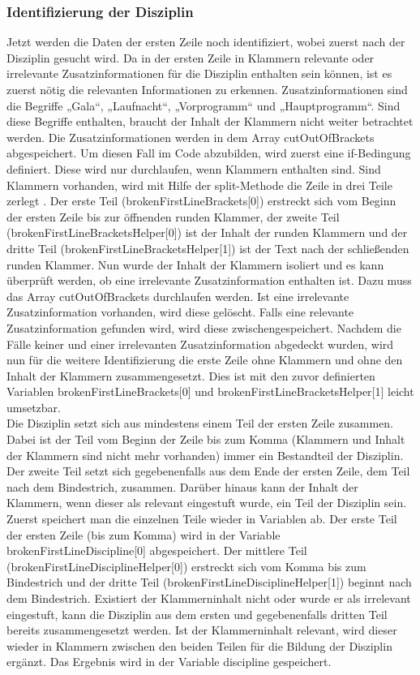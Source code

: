 \subsubsection{Identifizierung der Disziplin}
Jetzt werden die Daten der ersten Zeile noch identifiziert, wobei zuerst nach der Disziplin gesucht wird.
Da in der ersten Zeile in Klammern relevante oder irrelevante Zusatzinformationen für die Disziplin enthalten sein können, ist es zuerst nötig die relevanten Informationen zu erkennen. Zusatzinformationen sind die Begriffe „Gala“, „Laufnacht“, „Vorprogramm“ und „Hauptprogramm“. Sind diese Begriffe enthalten, braucht der Inhalt der Klammern nicht weiter betrachtet werden. Die Zusatzinformationen werden in dem Array cutOutOfBrackets abgespeichert. Um diesen Fall im Code abzubilden, wird zuerst eine if-Bedingung definiert. Diese wird nur durchlaufen, wenn Klammern enthalten sind. Sind Klammern vorhanden, wird mit Hilfe der split-Methode die Zeile in drei Teile zerlegt \cite{split}. Der erste Teil (brokenFirstLineBrackets[0]) erstreckt sich vom Beginn der ersten Zeile bis zur öffnenden runden Klammer, der zweite Teil (brokenFirstLineBracketsHelper[0]) ist der Inhalt der runden Klammern und der dritte Teil (brokenFirstLineBracketsHelper[1]) ist der Text nach der schließenden runden Klammer. Nun wurde der Inhalt der Klammern isoliert und es kann überprüft werden, ob eine irrelevante Zusatzinformation enthalten ist. Dazu muss das Array cutOutOfBrackets durchlaufen werden. Ist eine irrelevante Zusatzinformation vorhanden, wird diese gelöscht. Falls eine relevante Zusatzinformation gefunden wird, wird diese zwischengespeichert. Nachdem die Fälle keiner und einer irrelevanten Zusatzinformation abgedeckt wurden, wird nun für die weitere Identifizierung die erste Zeile ohne Klammern und ohne den Inhalt der Klammern zusammengesetzt. Dies ist mit den zuvor definierten Variablen brokenFirstLineBrackets[0] und brokenFirstLineBracketsHelper[1] leicht umsetzbar.\\
Die Disziplin setzt sich aus mindestens einem Teil der ersten Zeile zusammen. Dabei ist der Teil vom Beginn der Zeile bis zum Komma (Klammern und Inhalt der Klammern sind nicht mehr vorhanden) immer ein Bestandteil der Disziplin. Der zweite Teil setzt sich gegebenenfalls aus dem Ende der ersten Zeile, dem Teil nach dem Bindestrich, zusammen. Darüber hinaus kann der Inhalt der Klammern, wenn dieser als relevant eingestuft wurde, ein Teil der Disziplin sein.
Zuerst speichert man die einzelnen Teile wieder in Variablen ab. Der erste Teil der ersten Zeile (bis zum Komma) wird in der Variable brokenFirstLineDiscipline[0] abgespeichert. Der mittlere Teil (brokenFirstLineDisciplineHelper[0]) erstreckt sich vom Komma bis zum Bindestrich und der dritte Teil (brokenFirstLineDisciplineHelper[1]) beginnt nach dem Bindestrich. Existiert der Klammerninhalt nicht oder wurde er als irrelevant eingestuft, kann die Disziplin aus dem ersten und gegebenenfalls dritten Teil bereits zusammengesetzt werden. Ist der Klammerninhalt relevant, wird dieser wieder in Klammern zwischen den beiden Teilen für die Bildung der Disziplin ergänzt. Das Ergebnis wird in der Variable discipline gespeichert.\\
